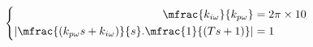 \begin{equation}
\centering
\left\{\begin{split}
\mfrac{k_{i\omega}}{k_{p\omega}} &=2\pi \times 10 \\
|\mfrac{(k_{p\omega}s + k_{i\omega})}{s}.\mfrac{1}{(T s + 1)}| &= 1 \\ 
\end{split}\right.
 \end{equation}